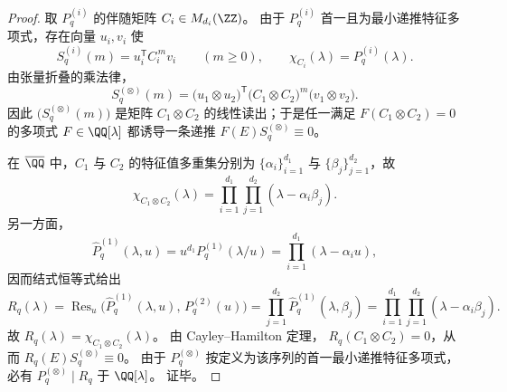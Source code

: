 \begin{proof}
取 \(P_q^{(i)}\) 的伴随矩阵 \(C_i\in M_{d_i}(\ZZ)\)。
由于 \(P_q^{(i)}\) 首一且为最小递推特征多项式，存在向量 \(u_i,v_i\) 使
\[
S_q^{(i)}(m)=u_i^{\mathsf T}C_i^{\,m}v_i\qquad(m\ge 0),
\qquad
\chi_{C_i}(\lambda)=P_q^{(i)}(\lambda).
\]
由张量折叠的乘法律，
\[
S_q^{(\otimes)}(m)
=\bigl(u_1\otimes u_2\bigr)^{\mathsf T}
\bigl(C_1\otimes C_2\bigr)^{m}
\bigl(v_1\otimes v_2\bigr).
\]
因此 \(\bigl(S_q^{(\otimes)}(m)\bigr)\) 是矩阵 \(C_1\otimes C_2\) 的线性读出；于是任一满足
\(
F(C_1\otimes C_2)=0
\)
的多项式 \(F\in\QQ[\lambda]\) 都诱导一条递推
\(
F(E)S_q^{(\otimes)}\equiv 0
\)。

在 \(\overline{\QQ}\) 中，\(C_1\) 与 \(C_2\) 的特征值多重集分别为 \(\{\alpha_i\}_{i=1}^{d_1}\) 与 \(\{\beta_j\}_{j=1}^{d_2}\)，故
\[
\chi_{C_1\otimes C_2}(\lambda)
=\prod_{i=1}^{d_1}\prod_{j=1}^{d_2}(\lambda-\alpha_i\beta_j).
\]
另一方面，
\[
\widehat P_q^{(1)}(\lambda,u)
=u^{d_1}P_q^{(1)}(\lambda/u)
=\prod_{i=1}^{d_1}(\lambda-\alpha_i u),
\]
因而结式恒等式给出
\[
R_q(\lambda)
=\operatorname{Res}_{u}\!\bigl(\widehat P_q^{(1)}(\lambda,u),\,P_q^{(2)}(u)\bigr)
=\prod_{j=1}^{d_2}\widehat P_q^{(1)}(\lambda,\beta_j)
=\prod_{i=1}^{d_1}\prod_{j=1}^{d_2}(\lambda-\alpha_i\beta_j).
\]
故 \(R_q(\lambda)=\chi_{C_1\otimes C_2}(\lambda)\)。
由 Cayley--Hamilton 定理，
\(
R_q(C_1\otimes C_2)=0
\)，从而 \(R_q(E)S_q^{(\otimes)}\equiv 0\)。
由于 \(P_q^{(\otimes)}\) 按定义为该序列的首一最小递推特征多项式，必有
\(
P_q^{(\otimes)}\mid R_q
\)
于 \(\QQ[\lambda]\)。
证毕。
\end{proof}

